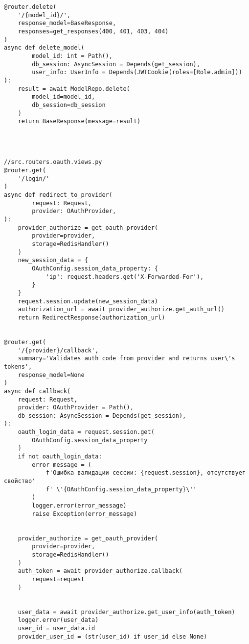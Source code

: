 \begin{lstlisting}
@router.delete(
    '/{model_id}/',
    response_model=BaseResponse,
    responses=get_responses(400, 401, 403, 404)
)
async def delete_model(
        model_id: int = Path(),
        db_session: AsyncSession = Depends(get_session),
        user_info: UserInfo = Depends(JWTCookie(roles=[Role.admin]))
):
    result = await ModelRepo.delete(
        model_id=model_id,
        db_session=db_session
    )
    return BaseResponse(message=result)




//src.routers.oauth.views.py
@router.get(
    '/login/'
)
async def redirect_to_provider(
        request: Request,
        provider: OAuthProvider,
):
    provider_authorize = get_oauth_provider(
        provider=provider,
        storage=RedisHandler()
    )
    new_session_data = {
        OAuthConfig.session_data_property: {
            'ip': request.headers.get('X-Forwarded-For'),
        }
    }
    request.session.update(new_session_data)
    authorization_url = await provider_authorize.get_auth_url()
    return RedirectResponse(authorization_url)


@router.get(
    '/{provider}/callback',
    summary='Validates auth code from provider and returns user\'s tokens',
    response_model=None
)
async def callback(
    request: Request,
    provider: OAuthProvider = Path(),
    db_session: AsyncSession = Depends(get_session),
):
    oauth_login_data = request.session.get(
        OAuthConfig.session_data_property
    )
    if not oauth_login_data:
        error_message = (
            f'Ошибка валидации сессии: {request.session}, отсутствует свойство'
            f' \'{OAuthConfig.session_data_property}\''
        )
        logger.error(error_message)
        raise Exception(error_message)


    provider_authorize = get_oauth_provider(
        provider=provider,
        storage=RedisHandler()
    )
    auth_token = await provider_authorize.callback(
        request=request
    )


    user_data = await provider_authorize.get_user_info(auth_token)
    logger.error(user_data)
    user_id = user_data.id
    provider_user_id = (str(user_id) if user_id else None)



\end{lstlisting}
